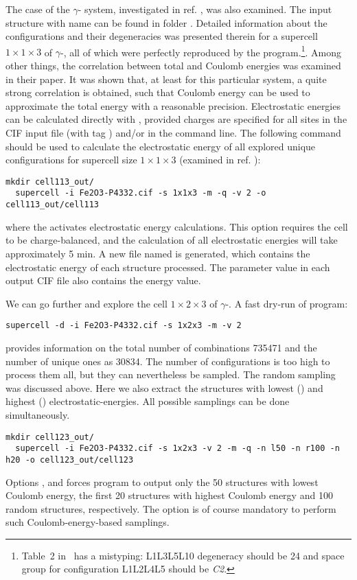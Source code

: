 \documentclass[a4paper,10pt]{article}
\begin{document}
The case of the $\gamma$- system, investigated in ref. \cite{Grau2010}, was also examined. The input structure with name  can be found in folder . Detailed information about the configurations and their degeneracies was presented therein for a supercell $1\times1\times3$ of $\gamma$-, all of which were perfectly reproduced by the \sups{} program.\footnote{Table~2 in~\cite{Grau2010} has a mistyping: L1L3L5L10 degeneracy should be 24 and space group for configuration L1L2L4L5 should be \textit{C2}.}. Among other things, the correlation between total and Coulomb energies was examined in their paper. It was shown that, at least for this particular system, a quite strong correlation is obtained, such that Coulomb energy can be used to approximate the total energy with a reasonable precision. Electrostatic energies can be calculated directly with \sups{}, provided charges are specified for all sites in the CIF input file (with tag ) and/or in the command line. The following command should be used to calculate the electrostatic energy of all explored unique configurations for supercell size $1\times1\times3$ (examined in ref. \cite{Grau2010}):
\begin{Verbatim}[breaklines]
  mkdir cell113_out/
  supercell -i Fe2O3-P4332.cif -s 1x1x3 -m -q -v 2 -o cell113_out/cell113 
\end{Verbatim}
where the  activates electrostatic energy calculations. This option requires the cell to be charge-balanced, and the calculation of all electrostatic energies will take approximately 5 min. A new file named  is generated, which contains the electrostatic energy of each structure processed. The  parameter value in each output CIF file also contains the energy value.

We can go further and explore the cell $1\times2\times3$ of $\gamma$-. A fast dry-run of \sups{} program:
\begin{Verbatim}[breaklines]
  supercell -d -i Fe2O3-P4332.cif -s 1x2x3 -m -v 2 
\end{Verbatim}
provides information on the total number of combinations \num{735471} and the number of unique ones as \num{30834}. The number of configurations is too high to process them all, but they can nevertheless be sampled. The random sampling was discussed above. Here we also extract the structures with lowest () and highest () electrostatic-energies. All possible samplings can be done simultaneously. 
\begin{Verbatim}[breaklines]
  mkdir cell123_out/
  supercell -i Fe2O3-P4332.cif -s 1x2x3 -v 2 -m -q -n l50 -n r100 -n h20 -o cell123_out/cell123
\end{Verbatim}
Options ,  and  forces program to output only the 50 structures with lowest Coulomb energy, the first 20 structures with highest Coulomb energy and 100 random structures, respectively. The  option is of course mandatory to perform such Coulomb-energy-based samplings.
\end{document}

